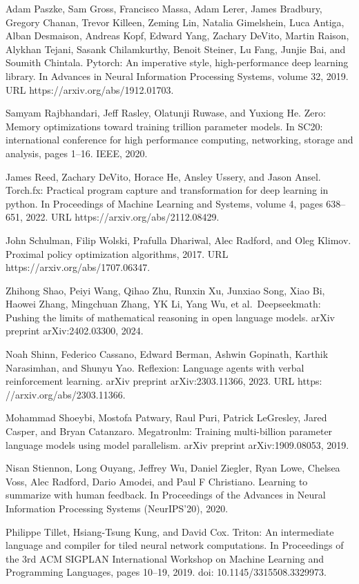 \documentclass[
  10
]{article}
\begin{document}
Adam Paszke, Sam Gross, Francisco Massa, Adam Lerer, James Bradbury,
Gregory Chanan, Trevor Killeen, Zeming Lin, Natalia Gimelshein, Luca
Antiga, Alban Desmaison, Andreas Kopf, Edward Yang, Zachary DeVito,
Martin Raison, Alykhan Tejani, Sasank Chilamkurthy, Benoit Steiner, Lu
Fang, Junjie Bai, and Soumith Chintala. Pytorch: An imperative style,
high-performance deep learning library. In Advances in Neural
Information Processing Systems, volume 32, 2019. URL
https://arxiv.org/abs/1912.01703.

Samyam Rajbhandari, Jeff Rasley, Olatunji Ruwase, and Yuxiong He. Zero:
Memory optimizations toward training trillion parameter models. In SC20:
international conference for high performance computing, networking,
storage and analysis, pages 1--16. IEEE, 2020.

James Reed, Zachary DeVito, Horace He, Ansley Ussery, and Jason Ansel.
Torch.fx: Practical program capture and transformation for deep learning
in python. In Proceedings of Machine Learning and Systems, volume 4,
pages 638--651, 2022. URL https://arxiv.org/abs/2112.08429.

John Schulman, Filip Wolski, Prafulla Dhariwal, Alec Radford, and Oleg
Klimov. Proximal policy optimization algorithms, 2017. URL
https://arxiv.org/abs/1707.06347.

Zhihong Shao, Peiyi Wang, Qihao Zhu, Runxin Xu, Junxiao Song, Xiao Bi,
Haowei Zhang, Mingchuan Zhang, YK Li, Yang Wu, et al.~Deepseekmath:
Pushing the limits of mathematical reasoning in open language models.
arXiv preprint arXiv:2402.03300, 2024.

Noah Shinn, Federico Cassano, Edward Berman, Ashwin Gopinath, Karthik
Narasimhan, and Shunyu Yao. Reflexion: Language agents with verbal
reinforcement learning. arXiv preprint arXiv:2303.11366, 2023. URL
https: //arxiv.org/abs/2303.11366.

Mohammad Shoeybi, Mostofa Patwary, Raul Puri, Patrick LeGresley, Jared
Casper, and Bryan Catanzaro. Megatronlm: Training multi-billion
parameter language models using model parallelism. arXiv preprint
arXiv:1909.08053, 2019.

Nisan Stiennon, Long Ouyang, Jeffrey Wu, Daniel Ziegler, Ryan Lowe,
Chelsea Voss, Alec Radford, Dario Amodei, and Paul F Christiano.
Learning to summarize with human feedback. In Proceedings of the
Advances in Neural Information Processing Systems (NeurIPS'20), 2020.

Philippe Tillet, Hsiang-Tsung Kung, and David Cox. Triton: An
intermediate language and compiler for tiled neural network
computations. In Proceedings of the 3rd ACM SIGPLAN International
Workshop on Machine Learning and Programming Languages, pages 10--19,
2019. doi: 10.1145/3315508.3329973.
\end{document}
